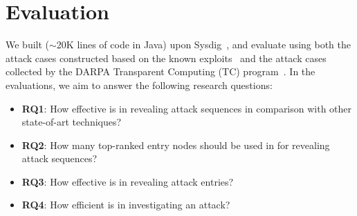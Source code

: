 \section{Evaluation}

We built \tool ($\sim$20K lines of code in Java) upon Sysdig~\cite{sysdig}, 
and evaluate \tool using both the attack cases constructed based on the known exploits~\cite{exploitdb,liu2018priotracker,kwon2018mci,reduction} and the attack cases collected by the DARPA Transparent Computing (TC) program~\cite{tc}.
In the evaluations, we aim to answer the following research questions:

\begin{itemize}[noitemsep, topsep=1pt, partopsep=1pt, listparindent=\parindent, leftmargin=*]
\item \textbf{RQ1}: How effective is \tool in revealing attack sequences in comparison with other state-of-art techniques? 
\item \textbf{RQ2}: How many top-ranked entry nodes should be used in \tool for revealing attack sequences?
\item \textbf{RQ3}: How effective is \tool in revealing attack entries?
\item \textbf{RQ4}: How efficient is \tool in investigating an attack?
\end{itemize}






